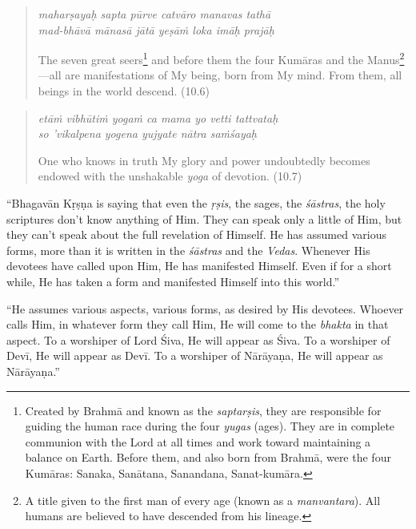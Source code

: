 \documentclass[12pt, twoside, openright]{memoir}
\begin{document}
\par
\begin{verse}
\textit{maharṣayaḥ sapta pūrve catvāro manavas tathā} \\
\textit{mad-bhāvā mānasā jātā yeṣāṁ loka imāḥ prajāḥ}

\noindent The seven great seers\footnote{Created by Brahmā and known as the \textit{saptarṣis}, they are responsible for guiding the human race during the four \textit{yugas} (ages). They are in complete communion with the Lord at all times and work toward maintaining a balance on Earth. Before them, and also born from Brahmā, were the four Kumāras: Sanaka, Sanātana, Sanandana, Sanat-kumāra.} and before them the four Kumāras and the Manus\footnote{A title given to the first man of every age (known as a \textit{manvantara}). All humans are believed to have descended from his lineage. }---all are manifestations of My being, born from My mind. From them, all beings in the world descend. (10.6)
\end{verse}
\par



\par
\begin{verse}
\textit{etāṁ vibhūtiṁ yogaṁ ca mama yo vetti tattvataḥ} \\
\textit{so ’vikalpena yogena yujyate nātra saṁśayaḥ}

\noindent One who knows in truth My glory and power undoubtedly becomes endowed with the unshakable \textit{yoga} of devotion. (10.7)
\end{verse}
\par


\enquote{Bhagavān Kṛṣṇa is saying that even the \textit{ṛṣis}, the sages, the \textit{śāstras}, the holy scriptures don’t know anything of Him. They can speak only a little of Him, but they can’t speak about the full revelation of Himself. He has assumed various forms, more than it is written in the \textit{śāstras} and the \textit{Vedas}. Whenever His devotees have called upon Him, He has manifested Himself. Even if for a short while, He has taken a form and manifested Himself into this world.}

\enquote{He assumes various aspects, various forms, as desired by His devotees. Whoever calls Him, in whatever form they call Him, He will come to the \textit{bhakta} in that aspect. To a worshiper of Lord Śiva, He will appear as Śiva. To a worshiper of Devī, He will appear as Devī. To a worshiper of Nārāyaṇa, He will appear as Nārāyaṇa.}
\end{document}

